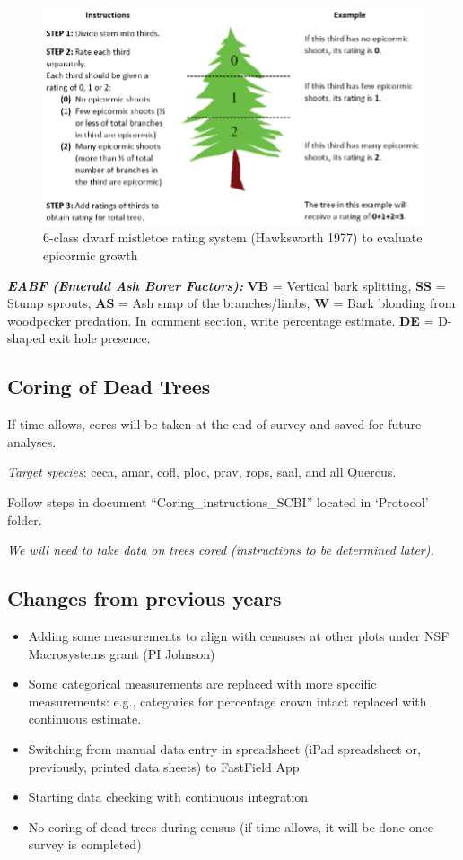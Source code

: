 \documentclass[
]{article}
\providecommand{\tightlist}{%
  \setlength{\itemsep}{0pt}\setlength{\parskip}{0pt}}
\begin{document}
\begin{figure}
\centering
\includegraphics{figures_tables/epicormics_assessment.png}
\caption{6-class dwarf mistletoe rating system (Hawksworth 1977) to
evaluate epicormic growth}
\end{figure}

\textbf{\emph{EABF (Emerald Ash Borer Factors):}} \textbf{VB} = Vertical
bark splitting, \textbf{SS} = Stump sprouts, \textbf{AS} = Ash snap of
the branches/limbs, \textbf{W} = Bark blonding from woodpecker
predation. In comment section, write percentage estimate. \textbf{DE} =
D-shaped exit hole presence.

\newpage

\hypertarget{coring-of-dead-trees}{%
\subsection{Coring of Dead Trees}\label{coring-of-dead-trees}}

If time allows, cores will be taken at the end of survey and saved for
future analyses.

\emph{Target species}: ceca, amar, cofl, ploc, prav, rops, saal, and all
Quercus.

Follow steps in document ``Coring\_instructions\_SCBI'' located in
`Protocol' folder.

\emph{We will need to take data on trees cored (instructions to be
determined later).}

\hypertarget{changes-from-previous-years}{%
\subsection{Changes from previous
years}\label{changes-from-previous-years}}

\begin{itemize}
\tightlist
\item
  Adding some measurements to align with censuses at other plots under
  NSF Macrosystems grant (PI Johnson)
\item
  Some categorical measurements are replaced with more specific
  measurements: e.g., categories for percentage crown intact replaced
  with continuous estimate.
\item
  Switching from manual data entry in spreadsheet (iPad spreadsheet or,
  previously, printed data sheets) to FastField App
\item
  Starting data checking with continuous integration
\item
  No coring of dead trees during census (if time allows, it will be done
  once survey is completed)
\end{itemize}
\end{document}
